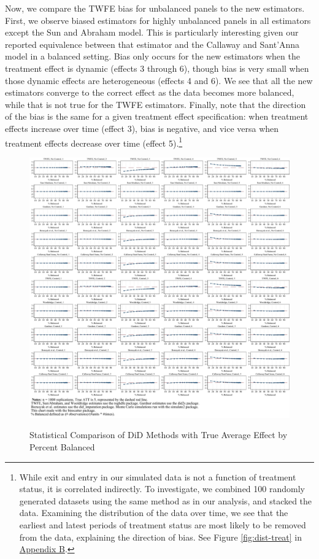 \documentclass[12pt]{article}
\begin{document}
Now, we compare the TWFE bias for unbalanced panels to the new estimators. First, we observe biased estimators for highly unbalanced panels in all estimators except the Sun and Abraham model. This is particularly interesting given our reported equivalence between that estimator and the Callaway and Sant’Anna model in a balanced setting. Bias only occurs for the new estimators when the treatment effect is dynamic (effects 3 through 6), though bias is very small when those dynamic effects are heterogeneous (effects 4 and 6). We see that all the new estimators converge to the correct effect as the data becomes more balanced, while that is not true for the TWFE estimators. Finally, note that the direction of the bias is the same for a given treatment effect specification: when treatment effects increase over time (effect 3), bias is negative, and vice versa when treatment effects decrease over time (effect 5).\footnote{While exit and entry in our simulated data is not a function of treatment status, it is correlated indirectly. To investigate, we combined 100 randomly generated datasets using the same method as in our analysis, and stacked the data. Examining the distribution of the data over time, we see that the earliest and latest periods of treatment status are most likely to be removed from the data, explaining the direction of bias. See Figure \ref{fig:dist-treat} in \hyperref[sec:appendixb]{Appendix B}.}
\begin{figure}[H]
    \centering
    \caption{Statistical Comparison of DiD Methods with True Average Effect by Percent Balanced}
    \includegraphics[width=6in]{Figures/Binscatters by Percent Balanced Common Scale.jpg}
    \label{fig:estimators-balanced}
\end{figure}
\end{document}
